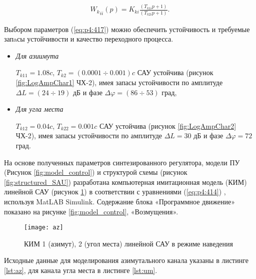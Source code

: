\begin{equation}%
\label{eq:p4:417}
\begin{alignedat}{2}
{W_{k}}_{ii} \left( p \right) =K_{ki}\frac{ \left( T_{k1i}p+1 \right) }{ \left( T_{k2i}p+1 \right) }.
\end{alignedat}
\end{equation}

Выбором параметров (\ref{eq:p4:417}) можно обеспечить устойчивость и требуемые запaсы устойчивости и качество переходного процесса. 
\begin{itemize}
	\item \textit{Для азиимута}\par
	$T_{k11} = 1.08 c$, $T_{k2} = (0.0001  \div 0.001) c$  САУ устойчива (рисунок \ref{fig:LogAmpChar1} ЧХ-2), имея запасы устойчивости по амплитуде $\varDelta L = (24 \div 19)$ дБ и фазе $\varDelta \varphi = (86 \div 53)$ град,
	\item \textit{Для угла места}\par
	$T_{k12} = 0.04 c$, $T_{k22} =  0.001 c$  САУ устойчива (рисунок \ref{fig:LogAmpChar2} ЧХ-2), имея запасы устойчивости по амплитуде $\varDelta L = 30$ дБ и фазе $\varDelta \varphi = 72$ град.
\end{itemize}

На основе полученных параметров синтезированного регулятора, модели ПУ (Рисунок \ref{fig:model_control}) и структурой схемы (рисунок \ref{fig:structured_SAU}) разработана компьютерная имитационная модель (КИМ) линейной САУ (рисунок \ref{fig:az}) в соответствии с уравнениями (\ref{eq:p4:414}) , используя MatLAB Simulink. Содержание блока «Программное движение» показано на рисунке \ref{fig:model_control}, «Возмущения». 

\begin{figure}[ht]
	\centering
	\texttt{[image: az]} 
	\caption{КИМ 1 (азимут), 2 (угол места) линейной САУ в режиме наведения}
	\label{fig:az}
\end{figure}

Исходные данные для моделирования азимутального канала указаны в листинге \ref{lst:az}, для канала угла места в листинге \ref{lst:um}. 

\begingroup
\captiondelim{ } %

\endgroup

\begingroup
\captiondelim{ } %

\endgroup


